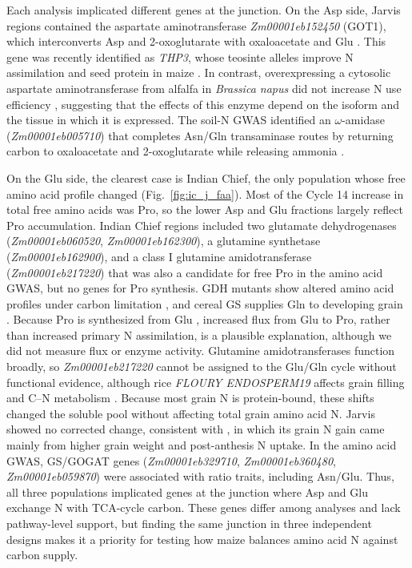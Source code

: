 Each analysis implicated different genes at the junction. On the Asp side, Jarvis regions contained the aspartate aminotransferase \textit{Zm00001eb152450} (GOT1), which interconverts Asp and 2-oxoglutarate with oxaloacetate and Glu \citep{Han2021Aspartate, Zhou2009AspAT}. This gene was recently identified as \textit{THP3}, whose teosinte alleles improve N assimilation and seed protein in maize \citep{Huang2026THP3}. In contrast, overexpressing a cytosolic aspartate aminotransferase from alfalfa in \textit{Brassica napus} did not increase N use efficiency \citep{McAllister2016AAT}, suggesting that the effects of this enzyme depend on the isoform and the tissue in which it is expressed. The soil-N GWAS identified an $\omega$-amidase (\textit{Zm00001eb005710}) that completes Asn/Gln transaminase routes by returning carbon to oxaloacetate and 2-oxoglutarate while releasing ammonia \citep{Zhang2014OmegaAmidase}.

On the Glu side, the clearest case is Indian Chief, the only population whose free amino acid profile changed (Fig.~\ref{fig:ic_j_faa}). Most of the Cycle 14 increase in total free amino acids was Pro, so the lower Asp and Glu fractions largely reflect Pro accumulation. Indian Chief regions included two glutamate dehydrogenases (\textit{Zm00001eb060520}, \textit{Zm00001eb162300}), a glutamine synthetase (\textit{Zm00001eb162900}), and a class I glutamine amidotransferase (\textit{Zm00001eb217220}) that was also a candidate for free Pro in the amino acid GWAS, but no genes for Pro synthesis. GDH mutants show altered amino acid profiles under carbon limitation \citep{Miyashita2008GDH, Dellero2020AminoNUE}, and cereal GS supplies Gln to developing grain \citep{Wei2021WheatGS, Fujita2022RiceGS13}. Because Pro is synthesized from Glu \citep{Lehmann2010ProMetab, Alvarez2022ProHub}, increased flux from Glu to Pro, rather than increased primary N assimilation, is a plausible explanation, although we did not measure flux or enzyme activity. Glutamine amidotransferases function broadly, so \textit{Zm00001eb217220} cannot be assigned to the Glu/Gln cycle without functional evidence, although rice \textit{FLOURY ENDOSPERM19} affects grain filling and C--N metabolism \citep{Lou2021FLO19}. Because most grain N is protein-bound, these shifts changed the soluble pool without affecting total grain amino acid N. Jarvis showed no corrected change, consistent with \citet{Moll1994}, in which its grain N gain came mainly from higher grain weight and post-anthesis N uptake. In the amino acid GWAS, GS/GOGAT genes (\textit{Zm00001eb329710}, \textit{Zm00001eb360480}, \textit{Zm00001eb059870}) were associated with ratio traits, including Asn/Glu. Thus, all three populations implicated genes at the junction where Asp and Glu exchange N with TCA-cycle carbon. These genes differ among analyses and lack pathway-level support, but finding the same junction in three independent designs makes it a priority for testing how maize balances amino acid N against carbon supply.


